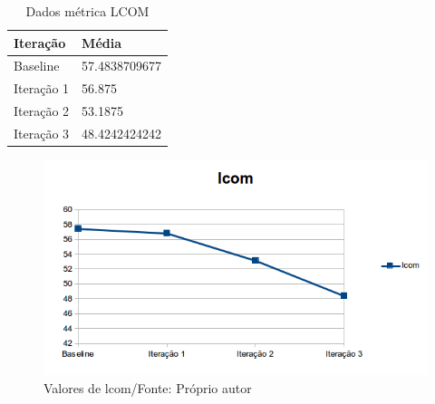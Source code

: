 \begin{table}[h]
	\centering
    \begin{tabular}{ | l | l | }
    \hline
    Iteração & Média 			\\ \hline
    Baseline & 57.4838709677   	\\ \hline
    Iteração 1 & 56.875			\\ \hline
	Iteração 2 & 53.1875		\\ \hline
	Iteração 3 & 48.4242424242	\\ \hline
    \end{tabular}
    \caption{Dados métrica LCOM}
    \label{tab:lcom}
\end{table}

\begin{figure}[h]
	\centering
	\includegraphics{img/lcom.png}
	\caption{Valores de lcom/Fonte: Próprio autor}
	\label{fig:lcom}
\end{figure}
